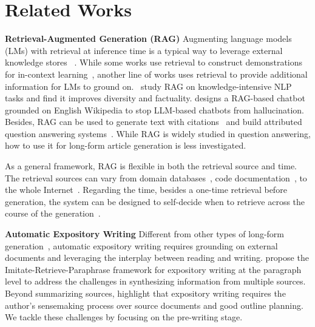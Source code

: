 \documentclass[11pt]{article}
\begin{document}


\section{Related Works}

\label{sec:related_work}
\noindent
\textbf{Retrieval-Augmented Generation (RAG)}\quad
Augmenting language models (LMs) with retrieval at inference time is a typical way to leverage external knowledge stores%
~\citep{ram2023ralm,JMLR:v24:23-0037}. While some works use retrieval to construct demonstrations for in-context learning~\citep{li-etal-2023-unified,liu-etal-2022-makes,agrawal-etal-2023-context,poesia2022synchromesh,shi-etal-2022-nearest,khattab2022demonstrate}, another line of works uses retrieval to provide additional information for LMs to ground on.~\citet{lewis2020retrieval} study RAG on knowledge-intensive NLP tasks and find it improves diversity and factuality. \citet{semnani-etal-2023-wikichat} designs a RAG-based chatbot grounded on English Wikipedia to stop LLM-based chatbots from hallucination. Besides, RAG can be used to generate text with citations~\citep{menick2022teaching,gao-etal-2023-enabling} and build attributed question answering systems~\citep{bohnet2023attributed}. %
While RAG is widely studied in question answering, how to use it for long-form article generation is less investigated.%

As a general framework, RAG is flexible in both the retrieval source and time. The retrieval sources can vary from domain databases~\citep{zakka2023almanac}, code documentation~\citep{zhou2023docprompting}, to the whole Internet~\citep{nakano2022webgpt,komeili-etal-2022-internet}. Regarding the time, %
besides a one-time retrieval before generation, the system can be designed to self-decide when %
to retrieve across the course of the generation~\citep{jiang-etal-2023-active, parisi2022talm,shuster-etal-2022-language,yao2023react}. %



\noindent
\textbf{Automatic Expository Writing}\quad
Different from other types of long-form generation~\citep{yang-etal-2022-re3, feng2018topic}, %
automatic expository writing requires grounding on external documents and leveraging the interplay between reading and writing. \citet{balepur-etal-2023-expository} propose the Imitate-Retrieve-Paraphrase framework for expository writing at the paragraph level to address the challenges in synthesizing information from multiple sources. Beyond summarizing sources, 
\citet{shen2023summarization} highlight that expository writing requires the author's sensemaking process over source documents and good outline planning. We tackle these challenges by focusing on the pre-writing stage.
\end{document}
